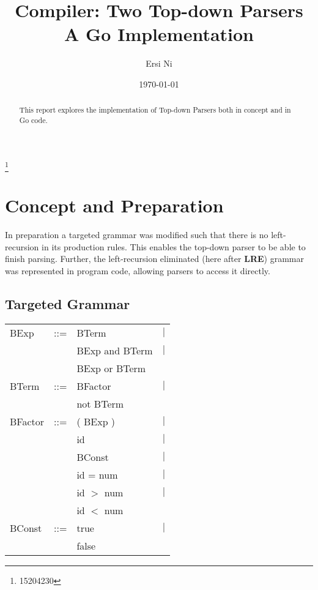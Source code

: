 \documentclass[%
 aip,
 jmp,%
 amsmath,amssymb,
 reprint,%
]{revtex4-1}
\begin{document}

\title[Two Top-down Parsers, a Computer Construction assignment report]{Compiler: Two Top-down Parsers\\
A Go Implementation}%

\author{Ersi Ni}\thanks{15204230}


\date{\today}%

\begin{abstract}
This report explores the implementation of Top-down Parsers both in concept and in Go code.

\end{abstract}

\maketitle



\section{Concept and Preparation}
In preparation a targeted grammar was modified such that there is no left-recursion in its production rules. This enables the top-down parser to be able to finish parsing. Further, the left-recursion eliminated (here after \textbf{LRE}) grammar was represented in program code, allowing parsers to access it directly.
\subsection{Targeted Grammar}
\begin{tabular}{lclr}
BExp 	&::=& BTerm	&	$|$\\
&&    BExp and BTerm	&$|$\\
&&	    BExp or BTerm&\\
BTerm 	&::=& BFactor	&	$|$\\
&&	    not BTerm&\\
BFactor&	::=& ( BExp )	&	$|$\\
&&	    id		&	$|$\\
&&	    BConst	&	$|$\\
&&	    id = num	&	$|$\\
&&	    id $>$ num	&	$|$\\
&&	    id $<$ num&\\
BConst&	::=& true&		$|$\\
&&	    false&
\end{tabular}
\end{document}
